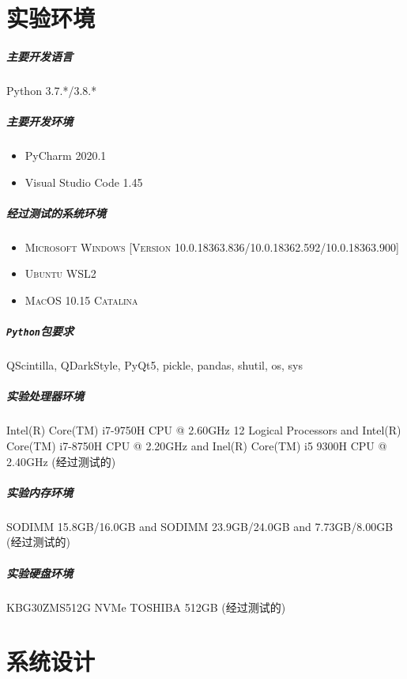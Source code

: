 \documentclass[UTF8]{ctexrep} %
\begin{document}
\chapter{实验环境}
\paragraph{主要开发语言}Python 3.7.*/3.8.*
\paragraph{主要开发环境}
\begin{itemize}
    \item PyCharm 2020.1
    \item Visual Studio Code 1.45
\end{itemize}
\paragraph{经过测试的系统环境}
\begin{itemize}
    \item \textsc{Microsoft Windows [Version 10.0.18363.836/10.0.18362.592/10.0.18363.900]}
    \item \textsc{Ubuntu WSL2}
    \item \textsc{MacOS 10.15 Catalina}
\end{itemize}
\paragraph{\texttt{Python}包要求}QScintilla, QDarkStyle, PyQt5, pickle, pandas, shutil, os, sys
\paragraph{实验处理器环境} Intel(R) Core(TM) i7-9750H CPU @ 2.60GHz 12 Logical Processors and Intel(R) Core(TM) i7-8750H CPU @ 2.20GHz and Inel(R) Core(TM) i5 9300H CPU @ 2.40GHz (经过测试的)
\paragraph{实验内存环境} SODIMM 15.8GB/16.0GB and SODIMM 23.9GB/24.0GB and 7.73GB/8.00GB (经过测试的)
\paragraph{实验硬盘环境} KBG30ZMS512G NVMe TOSHIBA 512GB (经过测试的)

\chapter{系统设计}
\end{document}
